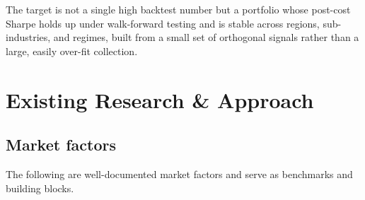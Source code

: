 \documentclass[11pt]{article}
\begin{document}
The target is not a single high backtest number but a portfolio whose post-cost Sharpe
holds up under walk-forward testing and is stable across regions, sub-industries, and
regimes, built from a small set of orthogonal signals rather than a large, easily
over-fit collection.

\section{Existing Research \& Approach}

\subsection{Market factors}

The following are well-documented market factors and serve as benchmarks and building blocks.
\end{document}
